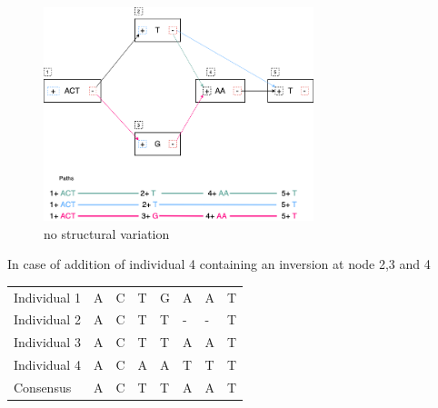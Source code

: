 \documentclass[11pt]{article}
\begin{document}
\begin{figure}[H]
\centering
\includegraphics[width=0.7\textwidth]{figures/Variation Graph-Page-1.png}
\caption{no structural variation}\label{no struct}
\end{figure}

\newpage
In case of addition of individual 4 containing an inversion at node 2,3 and 4

\begin{center}
\begin{tabular}{llllllll}
\color{mypink}Individual 1 & \color{mypink} A & \color{mypink} C & \color{mypink} T & \color{mypink} G & \color{mypink} A & \color{mypink} A & \color{mypink} T\\
\color{myblue}Individual 2 & \color{myblue} A & \color{myblue} C & \color{myblue} T & \color{myblue} T & \color{myblue} - & \color{myblue} - & \color{myblue} T\\
\color{mygreen}Individual 3 & \color{mygreen} A & \color{mygreen} C & \color{mygreen} T & \color{mygreen} T & \color{mygreen} A & \color{mygreen} A & \color{mygreen} T\\
\color{mypurple}Individual 4 & \color{mypurple} A & \color{mypurple} C & \color{mypurple} A & \color{mypurple} A & \color{mypurple} T & \color{mypurple} T & \color{mypurple} T\\
\hline
\color{red}Consensus & \color{red} A & \color{red} C & \color{red} T & \color{red} T & \color{red} A & \color{myred} A & \color{red} T\\
\end{tabular}
\end{center}
\end{document}
